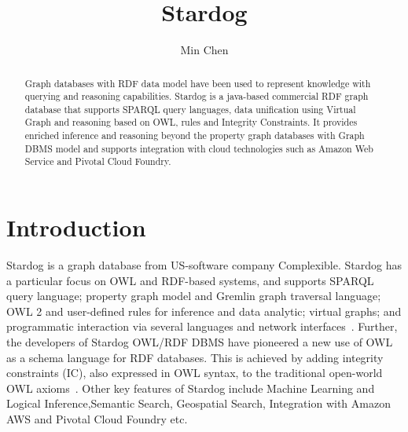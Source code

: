 
\title{Stardog}


\author{Min Chen}

\begin{abstract}
	Graph databases with RDF data model have been used to represent 
	knowledge with querying and reasoning capabilities. Stardog is a 
	java-based commercial RDF graph database that supports SPARQL query 
	languages, data unification using Virtual Graph and reasoning based on 
	OWL, rules and Integrity Constraints. It provides enriched inference and 
	reasoning beyond the property graph databases with Graph DBMS model 
	and supports integration with cloud technologies such as Amazon Web 
	Service and Pivotal	Cloud Foundry.

\end{abstract}


\maketitle

\section{Introduction}

	Stardog is a graph database from US-software company
	Complexible. Stardog has a particular focus on OWL and RDF-based
	systems, and supports SPARQL query language; property graph model and 
	Gremlin graph traversal language; OWL 2 and user-defined rules for 
	inference and data analytic; virtual graphs; and
	programmatic interaction via several languages and network
	interfaces~\cite{hid-sp18-405-www-stardog-docs}. Further, the
	developers of Stardog OWL/RDF DBMS have pioneered a new use of OWL 
	as a schema language for RDF databases. This is achieved by adding
	integrity constraints (IC), also expressed in OWL syntax, to the traditional  
	open-world OWL axioms~\cite{hid-sp18-405-cer2012graphical-stardog}. 
	Other key features of Stardog include Machine Learning and Logical 
	Inference,Semantic Search, Geospatial Search, Integration with Amazon 
	AWS and Pivotal Cloud Foundry etc.\ 

